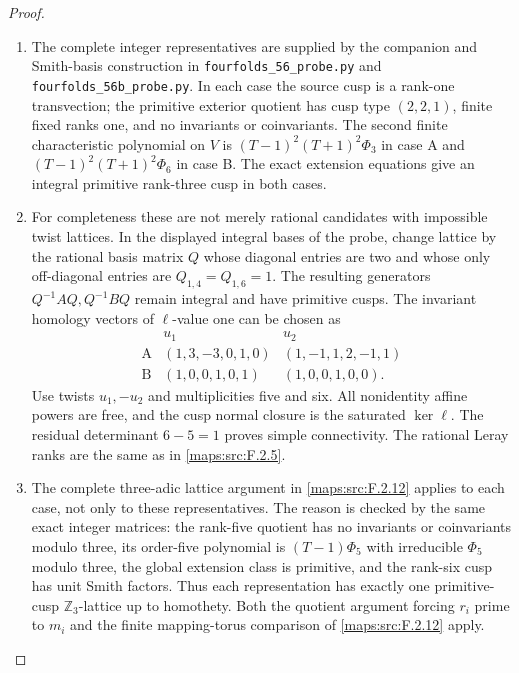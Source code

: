\documentclass[11pt,a4paper]{article}
\theoremstyle{definition}
\begin{document}
\begin{proof}
\begin{enumerate}[label=\arabic*.]
\item The complete integer representatives are supplied by the
companion and Smith-basis construction in
\texttt{fourfolds\_56\_probe.py} and
\texttt{fourfolds\_56b\_probe.py}.
In each case the source cusp is a rank-one transvection;
the primitive exterior quotient has cusp type $(2,2,1)$,
finite fixed ranks one, and no invariants or coinvariants.
The second finite characteristic polynomial on $V$ is
$(T-1)^2(T+1)^2\Phi_3$ in case A and
$(T-1)^2(T+1)^2\Phi_6$ in case B.
The exact extension equations give an integral primitive
rank-three cusp in both cases.

\item For completeness these are not merely rational candidates
with impossible twist lattices.  In the displayed integral
bases of the probe, change lattice by the rational basis
matrix $Q$ whose diagonal entries are two and whose only
off-diagonal entries are $Q_{1,4}=Q_{1,6}=1$.
The resulting generators $Q^{-1}AQ,Q^{-1}BQ$ remain
integral and have primitive cusps.
The invariant homology vectors of $\ell$-value one can be
chosen as
\[
\begin{array}{c|cc}
 &u_1&u_2\\\hline
 \mathrm A&(1,3,-3,0,1,0)&(1,-1,1,2,-1,1)\\
 \mathrm B&(1,0,0,1,0,1)&(1,0,0,1,0,0).
\end{array}
\]
Use twists $u_1,-u_2$ and multiplicities five and six.
All nonidentity affine powers are free, and the cusp normal
closure is the saturated $\ker\ell$.
The residual determinant $6-5=1$ proves simple connectivity.
The rational Leray ranks are the same as in \ref{maps:src:F.2.5}.

\item The complete three-adic lattice argument in \ref{maps:src:F.2.12} applies
to each case, not only to these representatives.
The reason is checked by the same exact integer matrices:
the rank-five quotient has no invariants or coinvariants
modulo three, its order-five polynomial is
$(T-1)\Phi_5$ with irreducible $\Phi_5$ modulo three, the
global extension class is primitive, and the rank-six
cusp has unit Smith factors.
Thus each representation has exactly one primitive-cusp
$\mathbb Z_3$-lattice up to homothety.
Both the quotient argument forcing $r_i$ prime to $m_i$
and the finite mapping-torus comparison of \ref{maps:src:F.2.12} apply.


\end{enumerate}
\end{proof}
\end{document}
